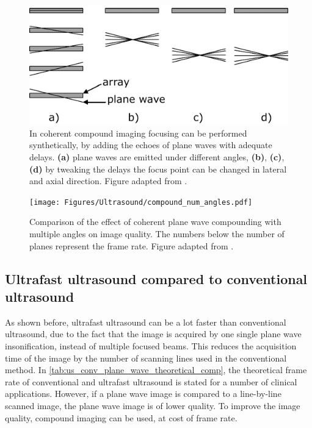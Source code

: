 \begin{figure}
	\centering
	\includegraphics[width=.6\linewidth]{Figures/Ultrasound/coherent_compounding.pdf}
	\caption{In coherent compound imaging focusing can be performed synthetically, by adding the echoes of plane waves with adequate delays. \textbf{(a)} plane waves are emitted under different angles, \textbf{(b)}, \textbf{(c)}, \textbf{(d)} by tweaking the delays the focus point can be changed in lateral and axial direction. Figure adapted from \citet{montaldo_coherent_2009}.}
	\label{fig:us_coherent_compounding}
\end{figure}


\begin{figure}
    \centering
    \texttt{[image: Figures/Ultrasound/compound\_num\_angles.pdf]}
    \caption{Comparison of the effect of coherent plane wave compounding with multiple angles on image quality. The numbers below the number of planes represent the frame rate. Figure adapted from \citet{montaldo_coherent_2009}.}
    \label{fig:us_compound_num_angles}
\end{figure}





\subsection{Ultrafast ultrasound compared to conventional ultrasound}
As shown before, ultrafast ultrasound can be a lot faster than conventional ultrasound, due to the fact that the image is acquired by one single plane wave insonification, instead of multiple focused beams. This reduces the acquisition time of the image by the number of scanning lines used in the conventional method. In \autoref{tab:us_conv_plane_wave_theoretical_comp}, the theoretical frame rate of conventional and ultrafast ultrasound is stated for a number of clinical applications. However, if a plane wave image is compared to a line-by-line scanned image, the plane wave image is of lower quality. To improve the image quality, compound imaging can be used, at cost of frame rate. 


